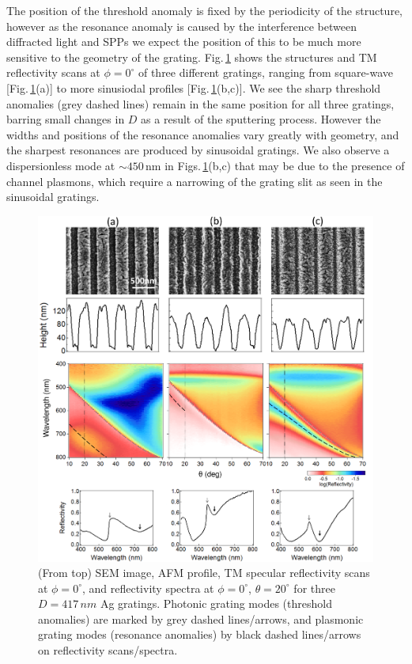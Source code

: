 The position of the threshold anomaly is fixed by the periodicity of the structure, however as the resonance anomaly is caused by the interference between diffracted light and SPPs we expect the position of this to be much more sensitive to the geometry of the grating. Fig.\,\ref{7Fig10} shows the structures and TM reflectivity scans at $\phi=0^{\circ}$ of three different gratings, ranging from square-wave [Fig.\,\ref{7Fig10}(a)] to more sinusiodal profiles [Fig.\,\ref{7Fig10}(b,c)]. We see the sharp threshold anomalies (grey dashed lines) remain in the same position for all three gratings, barring small changes in $D$ as a result of the sputtering process. However the widths and positions of the resonance anomalies vary greatly with geometry, and the sharpest resonances are produced by sinusoidal gratings. We also observe a dispersionless mode at $\sim450$\,nm in Figs.\,\ref{7Fig10}(b,c) that may be due to the presence of channel plasmons, which require a narrowing of the grating slit as seen in the sinusoidal gratings.
\begin{figure}[h!] 
\centering    
\includegraphics[width=\textwidth]{Fig10}
\caption[Effect of grating geometry on the optical spectra of $D=417$\,nm Ag gratings.] {(From top) SEM image, AFM profile, TM specular reflectivity scans at $\phi=0^{\circ}$, and reflectivity spectra at $\phi=0^{\circ}$, $\theta=20^{\circ}$ for three $D=417\,nm$ Ag gratings. Photonic grating modes (threshold anomalies) are marked by grey dashed lines/arrows, and plasmonic grating modes (resonance anomalies) by black dashed lines/arrows on reflectivity scans/spectra.}
\label{7Fig10}
\end{figure}

